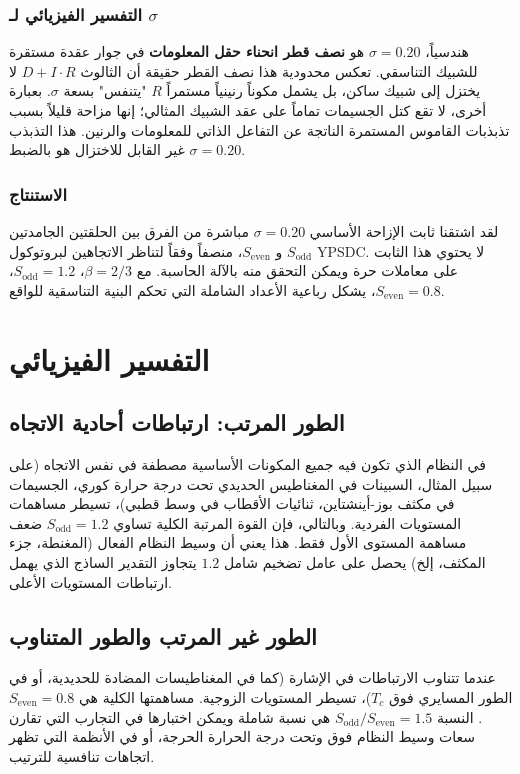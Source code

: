 \documentclass[11pt,a4paper]{article}
\begin{document}
	\subsubsection{التفسير الفيزيائي لـ \(\sigma\)}
	
	هندسياً، \(\sigma = 0.20\) هو \textbf{نصف قطر انحناء حقل المعلومات} في جوار عقدة مستقرة للشبيك التناسقي. تعكس محدودية هذا نصف القطر حقيقة أن الثالوث \(D+I\cdot R\) لا يختزل إلى شبيك ساكن، بل يشمل مكوناً رنينياً مستمراً \(R\) "يتنفس" بسعة \(\sigma\). بعبارة أخرى، لا تقع كتل الجسيمات تماماً على عقد الشبيك المثالي؛ إنها مزاحة قليلاً بسبب تذبذبات القاموس المستمرة الناتجة عن التفاعل الذاتي للمعلومات والرنين. هذا التذبذب غير القابل للاختزال هو بالضبط \(\sigma = 0.20\).
	
	\subsubsection{الاستنتاج}
	
	لقد اشتقنا ثابت الإزاحة الأساسي \(\sigma = 0.20\) مباشرة من الفرق بين الحلقتين الجامدتين \(S_{\mathrm{odd}}\) و \(S_{\mathrm{even}}\)، منصفاً وفقاً لتناظر الاتجاهين لبروتوكول YPSDC. لا يحتوي هذا الثابت على معاملات حرة ويمكن التحقق منه بالآلة الحاسبة. مع \(\beta = 2/3\)، \(S_{\mathrm{odd}} = 1.2\)، \(S_{\mathrm{even}} = 0.8\)، يشكل رباعية الأعداد الشاملة التي تحكم البنية التناسقية للواقع.
	
	\section{التفسير الفيزيائي}
	
	\subsection{الطور المرتب: ارتباطات أحادية الاتجاه}
	في النظام الذي تكون فيه جميع المكونات الأساسية مصطفة في نفس الاتجاه (على سبيل المثال، السبينات في المغناطيس الحديدي تحت درجة حرارة كوري، الجسيمات في مكثف بوز-أينشتاين، ثنائيات الأقطاب في وسط قطبي)، تسيطر مساهمات المستويات الفردية. وبالتالي، فإن القوة المرتبة الكلية تساوي \(S_{\text{odd}} = 1.2\) ضعف مساهمة المستوى الأول فقط. هذا يعني أن وسيط النظام الفعال (المغنطة، جزء المكثف، إلخ) يحصل على عامل تضخيم شامل \(1.2\) يتجاوز التقدير الساذج الذي يهمل ارتباطات المستويات الأعلى.
	
	\subsection{الطور غير المرتب والطور المتناوب}
	عندما تتناوب الارتباطات في الإشارة (كما في المغناطيسات المضادة للحديدية، أو في الطور المسايري فوق \(T_c\))، تسيطر المستويات الزوجية. مساهمتها الكلية هي \(S_{\text{even}} = 0.8\). النسبة \(S_{\text{odd}}/S_{\text{even}} = 1.5\) هي نسبة شاملة ويمكن اختبارها في التجارب التي تقارن سعات وسيط النظام فوق وتحت درجة الحرارة الحرجة، أو في الأنظمة التي تظهر اتجاهات تنافسية للترتيب.
	
\end{document}
